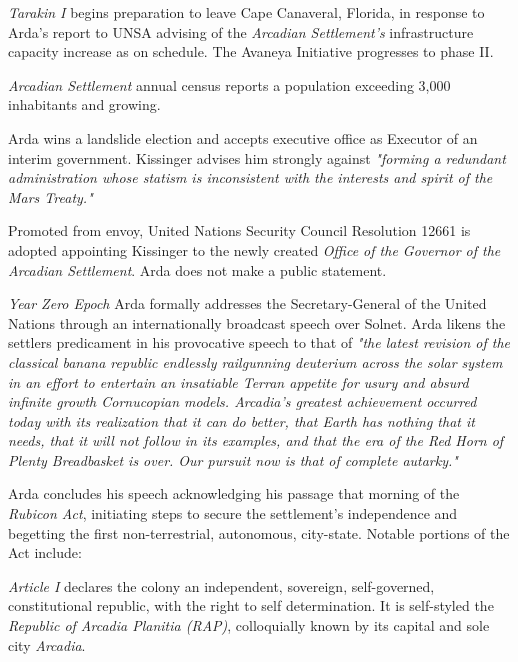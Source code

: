 {\it Tarakin I} begins preparation to leave Cape Canaveral, Florida, in response to Arda's report to UNSA advising of the {\it Arcadian Settlement's} infrastructure capacity increase as on schedule. The Avaneya Initiative progresses to phase II.
\StopTimelineDate

{\it Arcadian Settlement} annual census reports a population exceeding 3,000 inhabitants and growing.
\StopTimelineDate

Arda wins a landslide election and accepts executive office as Executor of an interim government. Kissinger advises him strongly against {\it "forming a redundant administration whose statism is inconsistent with the interests and spirit of the Mars Treaty."}
\StopTimelineDate

Promoted from envoy, United Nations Security Council Resolution 12661 is adopted appointing Kissinger to the newly created {\it Office of the Governor of the Arcadian Settlement}. Arda does not make a public statement.
\StopTimelineDate

{\it Year Zero Epoch}
Arda formally addresses the Secretary-General of the United Nations through an internationally broadcast speech over Solnet. Arda likens the settlers predicament in his provocative speech to that of {\it "the latest revision of the classical banana republic endlessly railgunning deuterium across the solar system in an effort to entertain an insatiable Terran appetite for usury and absurd infinite growth Cornucopian models. Arcadia's greatest achievement occurred today with its realization that it can do better, that Earth has nothing that it needs, that it will not follow in its examples, and that the era of the Red Horn of Plenty Breadbasket is over. Our pursuit now is that of complete autarky."}

Arda concludes his speech acknowledging his passage that morning of the {\it Rubicon Act}, initiating steps to secure the settlement's independence and begetting the first non-terrestrial, autonomous, city-state. Notable portions of the Act include:
\crlf

\startTimelineDocument
\startitemize[5]
\setupwhitespace[big]
\item {\it Article I} declares the colony an independent, sovereign, self-governed, constitutional republic, with the right to self determination. It is self-styled the {\it Republic of Arcadia Planitia (RAP)}, colloquially known by its capital and sole city {\it Arcadia}.

